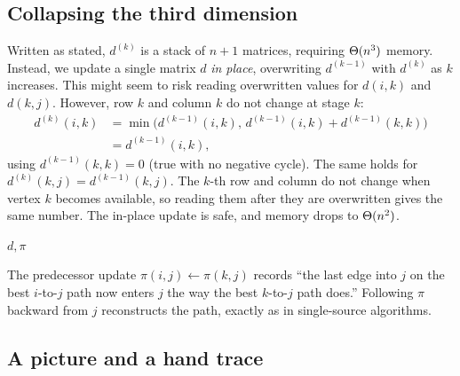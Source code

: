 \subsection{Collapsing the third dimension}

Written as stated, $d^{(k)}$ is a stack of $n+1$ matrices, requiring $\Theta(n^3)$ memory.
Instead, we update a single matrix $d$ \emph{in place}, overwriting $d^{(k-1)}$ with $d^{(k)}$ as $k$ increases. 
This might seem to risk reading overwritten values for $d(i,k)$ and $d(k,j)$. However, row $k$ and column $k$ do not change at stage $k$:
\begin{align*}
  d^{(k)}(i,k) &= \min\big(d^{(k-1)}(i,k),\, d^{(k-1)}(i,k)+d^{(k-1)}(k,k)\big) \\
  &= d^{(k-1)}(i,k),
\end{align*}
using $d^{(k-1)}(k,k)=0$ (true with no negative cycle). The same holds for $d^{(k)}(k,j)=d^{(k-1)}(k,j)$.
The $k$-th row and column do not change when vertex $k$ becomes available, so reading them after they are overwritten gives the same number. The in-place update is safe, and memory drops to $\Theta(n^2)$.

\begin{algorithm}[H]
\caption{Floyd--Warshall (distances, predecessors, negative-cycle flag)}
\label{ch09:alg-fw}
\DontPrintSemicolon
{}
\Return $d,\pi$\;
\end{algorithm}

The predecessor update $\pi(i,j)\leftarrow\pi(k,j)$ records ``the last edge into $j$ on the best
$i$-to-$j$ path now enters $j$ the way the best $k$-to-$j$ path does.'' Following $\pi$ backward from
$j$ reconstructs the path, exactly as in single-source algorithms.

\subsection{A picture and a hand trace}
\label{ch09:fw-trace}

